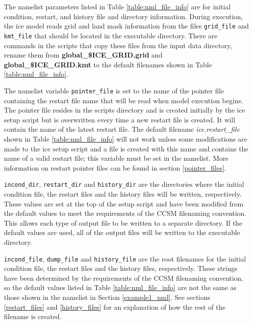 The namelist parameters listed in Table \ref{table:nml_file_info} are for
initial condition, restart, and history file and directory information.
During execution, the ice model reads grid and land mask information from
the files {\tt grid\_file} and {\tt kmt\_file} that should be located in
the executable directory. There are commands in the scripts that copy these
files from the input data directory, rename them from 
{\bf global\_\${ICE\_GRID}.grid} and {\bf global\_\${ICE\_GRID}.kmt} to the
default filenames shown in Table \ref{table:nml_file_info}.

The namelist variable {\tt pointer\_file} is set to the name of the pointer file
containing the restart file name that will be read when model execution
begins.  The pointer file resides in the scripts directory and is created initially
by the ice setup script but is overwritten every time a new restart file is created.
It will contain the name of the latest restart file.  The default filename 
{\it ice.restart\_file} shown in Table \ref{table:nml_file_info} will not work
unless some modifications are made to the ice setup script and a file is created
with this name and contains the name of a valid restart file; this variable must
be set in the namelist.  More information on restart pointer files can be found
in section \ref{pointer_files}.

{\tt incond\_dir}, {\tt restart\_dir} and {\tt history\_dir} are the directories
where the initial condition file, the restart files and the history files will
be written, respectively.  These values are set at the top of the setup script
and have been modified from the default values to meet the requirements of the
CCSM filenaming convention.  This allows each type of output file to be written
to a separate directory.  If the default values are used, all of the output
files will be written to the executable directory.

{\tt incond\_file}, {\tt dump\_file} and {\tt history\_file} are the root
filenames for the initial condition file, the restart files and the history files,
respectively.  These strings have been determined by the requirements of the CCSM
filenaming convention, so the default values listed in Table \ref{table:nml_file_info}
are not the same as those shown in the namelist in Section \ref{example1_nml}.  See sections
\ref{restart_files} and \ref{history_files} for an explanation of how the rest
of the filename is created.

